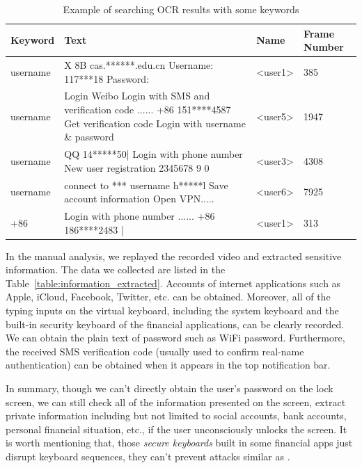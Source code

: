 \begin{table}[t]
	\centering
	\begin{tabular}{|l|l|l|l|}
		\hline
		Keyword  & Text                                                                                                                          & Name                           & Frame Number \\ \hline
		username & X 8B cas.******.edu.cn Username: 117***18 Password:                                                                           & \textless{}user1\textgreater{} & 385          \\ \hline
		username & Login Weibo Login with SMS and verification code ...... +86 151****4587 Get verification code Login with username \& password & \textless{}user5\textgreater{} & 1947         \\ \hline
		username & QQ 14*****50| Login with phone number New user registration 2345678 9 0                                                       & \textless{}user3\textgreater{} & 4308         \\ \hline
		username & connect to *** username h*****l Save account information Open VPN.....                                                        & \textless{}user6\textgreater{} & 7925         \\ \hline
		+86      & Login with phone number ...... +86 186****2483 |                                                                              & \textless{}user1\textgreater{} & 313          \\ \hline
	\end{tabular}
	\caption{Example of searching OCR results with some keywords}
	\label{tab:ocr_keyword_example}
\end{table}


In the manual analysis, we replayed the recorded video and extracted sensitive information.
The data we collected are listed in the Table~\ref{table:information_extracted}. 
Accounts of internet applications such as Apple, iCloud, Facebook, Twitter, etc. can be obtained. 
Moreover, all of the typing inputs on the virtual keyboard, including the system keyboard and the built-in security keyboard of the financial applications, can be clearly recorded.
We can obtain the plain text of password such as WiFi password.
Furthermore, the received SMS verification code (usually used to confirm real-name authentication) can be obtained when it appears in the top notification bar. 

In summary, though we can't directly obtain the user's password on the lock screen, we can still check all of the information presented on the screen, extract private information including but not limited to social accounts, bank accounts, personal financial situation, etc., if the user unconsciously unlocks the screen.
It is worth mentioning that, those \textit{secure keyboards} built in some financial apps just disrupt keyboard sequences, they can't prevent attacks similar as \tool.

